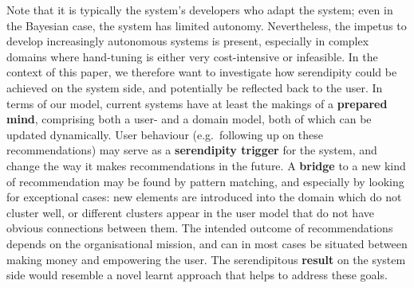 Note that it is typically the system's developers who adapt the system; even in the Bayesian case, the system has limited autonomy. Nevertheless, the impetus to develop increasingly autonomous systems is present, especially in complex domains where hand-tuning is either very cost-intensive or infeasible. In the context of this paper, we therefore want to investigate how serendipity could be achieved on the system side, and potentially be reflected back to the user. In terms of our model, current systems have at least the makings of a \textbf{prepared mind}, comprising both a user- and a domain model, both of which can be updated dynamically. User behaviour (e.g.~following up on these recommendations) may serve as a \textbf{serendipity trigger} for the system, and change the way it makes recommendations in the future. A \textbf{bridge} to a new kind of recommendation may be found by pattern matching, and especially by looking for exceptional cases: new elements are introduced into the domain which do not cluster well, or different clusters appear in the user model that do not have obvious connections between them. The intended outcome of recommendations depends on the organisational mission, and can in most cases be situated between making money and empowering the user. The serendipitous \textbf{result} on the system side would resemble a novel learnt approach that helps to address these goals.

